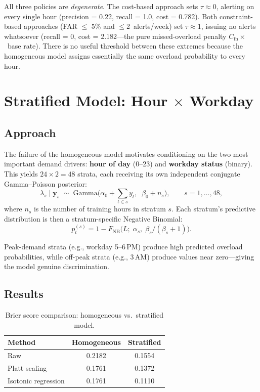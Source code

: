 \documentclass[12pt]{article}
\begin{document}
All three policies are \emph{degenerate}.  The cost-based approach sets
$\tau \approx 0$, alerting on every single hour (precision = 0.22,
recall = 1.0, cost = 0.782).  Both constraint-based approaches
(FAR $\le$ 5\% and $\le$2~alerts/week) set $\tau \approx 1$, issuing
no alerts whatsoever (recall = 0, cost = 2.182---the pure
missed-overload penalty $C_{\mathrm{fn}} \times$~base rate).  There
is no useful threshold between these extremes because the homogeneous model assigns
essentially the same overload probability to every hour.

\section{Stratified Model: Hour $\times$ Workday}
\label{sec:stratified}

\subsection{Approach}

The failure of the homogeneous model motivates conditioning on the two
most important demand drivers: \textbf{hour of day} (0--23) and
\textbf{workday status} (binary).  This yields $24 \times 2 = 48$
strata, each receiving its own independent conjugate Gamma--Poisson
posterior:
\begin{equation}
\lambda_s \mid \mathbf{y}_s
\;\sim\;
\text{Gamma}\!\bigl(\alpha_0 + \textstyle\sum_{t \in s} y_t,\;\;
\beta_0 + n_s\bigr),
\qquad s = 1, \dots, 48,
\end{equation}
where $n_s$ is the number of training hours in stratum $s$.  Each
stratum's predictive distribution is then a stratum-specific Negative
Binomial:
\begin{equation}
p_t^{(s)} = 1 - F_{\text{NB}}\!\bigl(L;\; \alpha_s,\;
\beta_s / (\beta_s + 1)\bigr).
\end{equation}

Peak-demand strata (e.g., workday 5--6\,PM) produce high predicted
overload probabilities, while off-peak strata (e.g., 3\,AM) produce
values near zero---giving the model genuine discrimination.

\subsection{Results}

\begin{table}[H]
\centering
\caption{Brier score comparison: homogeneous vs.\ stratified model.}
\label{tab:brier_compare}
\begin{tabular}{lcc}
\toprule
\textbf{Method} & \textbf{Homogeneous} & \textbf{Stratified} \\
\midrule
Raw & 0.2182 & 0.1554 \\
Platt scaling & 0.1761 & 0.1372 \\
Isotonic regression & 0.1761 & 0.1110 \\
\bottomrule
\end{tabular}
\end{table}
\end{document}
